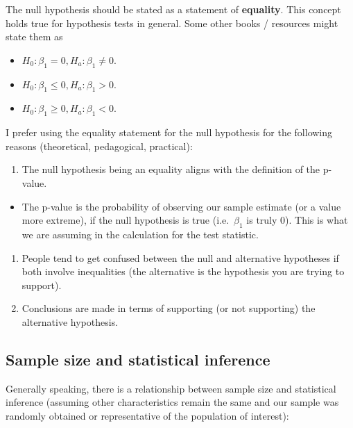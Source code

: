 \documentclass[
]{book}
\providecommand{\tightlist}{%
  \setlength{\itemsep}{0pt}\setlength{\parskip}{0pt}}
\begin{document}
The null hypothesis should be stated as a statement of \textbf{equality}. This concept holds true for hypothesis tests in general. Some other books / resources might state them as

\begin{itemize}
\tightlist
\item
  \(H_0: \beta_1 = 0, H_a: \beta_1 \neq 0\).
\item
  \(H_0: \beta_1 \leq 0, H_a: \beta_1 > 0\).
\item
  \(H_0: \beta_1 \geq 0, H_a: \beta_1 < 0\).
\end{itemize}

I prefer using the equality statement for the null hypothesis for the following reasons (theoretical, pedagogical, practical):

\begin{enumerate}
\def\labelenumi{\arabic{enumi}.}
\tightlist
\item
  The null hypothesis being an equality aligns with the definition of the p-value.
\end{enumerate}

\begin{itemize}
\tightlist
\item
  The p-value is the probability of observing our sample estimate (or a value more extreme), if the null hypothesis is true (i.e.~\(\beta_1\) is truly 0). This is what we are assuming in the calculation for the test statistic.
\end{itemize}

\begin{enumerate}
\def\labelenumi{\arabic{enumi}.}
\setcounter{enumi}{1}
\tightlist
\item
  People tend to get confused between the null and alternative hypotheses if both involve inequalities (the alternative is the hypothesis you are trying to support).
\item
  Conclusions are made in terms of supporting (or not supporting) the alternative hypothesis.
\end{enumerate}

\hypertarget{sample-size-and-statistical-inference}{%
\subsection{Sample size and statistical inference}\label{sample-size-and-statistical-inference}}

Generally speaking, there is a relationship between sample size and statistical inference (assuming other characteristics remain the same and our sample was randomly obtained or representative of the population of interest):
\end{document}
